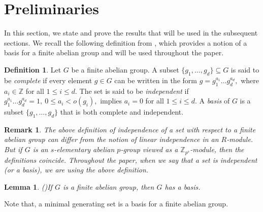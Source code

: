 \documentclass[preprint,sort&compress,12pt]{elsarticle}
\newtheorem{lemma}[theorem]{Lemma}
\newtheorem{remark}[theorem]{Remark}
\numberwithin{equation}{section}
\theoremstyle{definition}
\newtheorem{definition}[theorem]{Definition}
\newcommand{\Z}{\mathbb{Z}}
\begin{document}
\section{Preliminaries}
In this section, we state and prove the results that will be used in the subsequent sections.
We recall the following definition from \cite{Doug1951}, which provides a notion of a
basis for a finite abelian group and will be used throughout the paper.
\begin{definition} \label{definition of basis}
    Let \(G\) be a finite abelian group.
A subset \(\{g_{1},\ldots,g_{d}\} \subseteq G\) is said to be \emph{complete} if
every element \(g \in G\) can be written in the form
$g = g_{1}^{a_{1}} \ldots g_{d}^{a_{d}},$
where \(a_{i} \in \mathbb{Z}\) for all \(1 \leq i \leq d\).
The set is said to be \emph{independent} if
$g_{1}^{a_{1}} \ldots g_{d}^{a_{d}} = 1,
~ 0 \leq a_{i} < o(g_{i}),$
implies \(a_{i} = 0\) for all \(1 \leq i \leq d\).
A \emph{basis} of \(G\) is a subset \(\{g_{1},\ldots,g_{d}\}\) that is both
complete and independent.
 
\end{definition}

\begin{remark}
    The above definition of independence of a set with respect to a finite abelian group can differ from the notion of linear independence in an $R$-module. But if $G$ is an $s$-elementary abelian $p$-group viewed as a $\Z_{p^s}$-module, then the definitions coincide. Throughout the paper, when we say that a set is independent (or a basis), we are using the above definition.
\end{remark}


\begin{lemma} (\cite[Main result]{Doug1951})\label{existence of basis for finite abelian group}
    If $G$ is a finite abelian group, then $G$ has a basis.
\end{lemma}
Note that, a minimal generating set is a basis for a finite abelian group.
\end{document}
